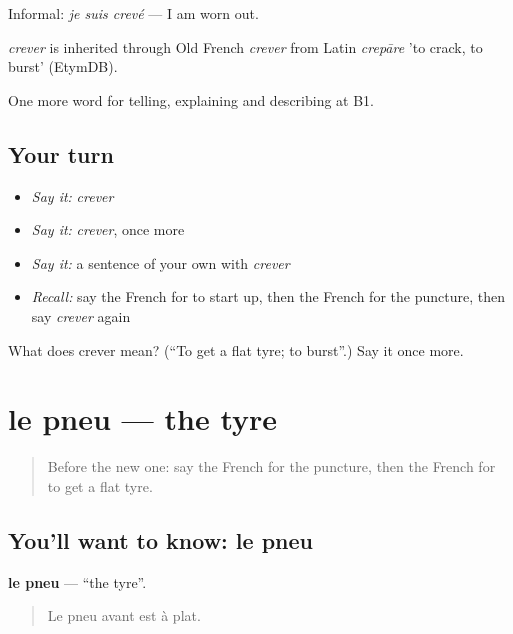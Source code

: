 Informal: \emph{je suis crevé} — I am worn out.

\begin{cousinweb}
\emph{crever} is inherited through Old French \emph{crever} from Latin \emph{crepāre} 'to crack, to burst' (EtymDB).
\end{cousinweb}

\begin{grammarlens}[title={What you've built}]
One more word for telling, explaining and describing at B1.
\end{grammarlens}

\subsection*{Your turn}
\begin{itemize}
\raggedright
  \item \emph{Say it:} \emph{crever}
  \item \emph{Say it:} \emph{crever}, once more
  \item \emph{Say it:} a sentence of your own with \emph{crever}
  \item \emph{Recall:} say the French for to start up, then the French for the puncture, then say \emph{crever} again
\end{itemize}

\begin{tcolorbox}[breakable,colback=teal!4,colframe=teal!35!black,title={Before you move on}]
What does crever mean? (\textquotedblleft{}To get a flat tyre; to burst\textquotedblright{}.) Say it once more.
\end{tcolorbox}
\section[le pneu]{le pneu — the tyre}

\label{lesson:FR-C404-pneu}



\begin{quote}
Before the new one: say the French for the puncture, then the French for to get a flat tyre.
\end{quote}

\subsection*{You'll want to know: le pneu}
\textbf{le pneu} — \textquotedblleft{}the tyre\textquotedblright{}.

\begin{quote}
Le pneu avant est à plat.
\end{quote}

